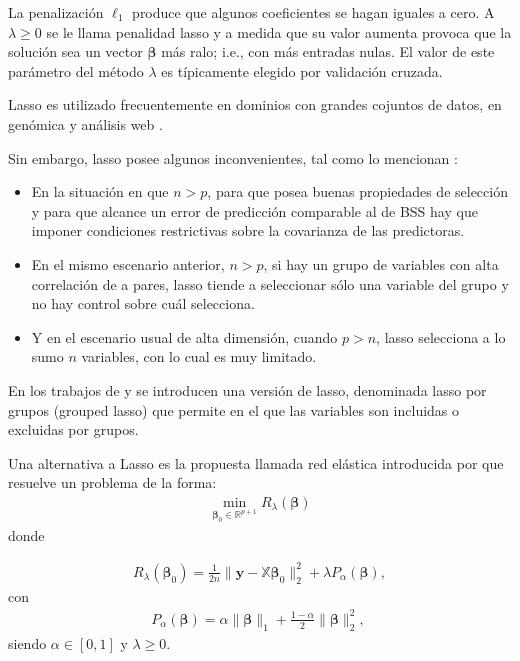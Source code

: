 \documentclass{report}
\begin{document}
 La penalización  $\ell_1$ produce que algunos coeficientes se hagan iguales a cero. A $\lambda \geq 0$  se le llama penalidad lasso y a medida que su valor aumenta provoca que la solución sea un vector $\boldsymbol{\beta}$ más ralo; i.e., con más entradas nulas. El valor de este parámetro del método $\lambda$ es típicamente elegido por validación cruzada. 


 Lasso es utilizado frecuentemente en dominios con grandes cojuntos de datos, en genómica y análisis web \cite{friedman2010}. 

 Sin embargo, lasso posee algunos inconvenientes, tal como lo mencionan \cite{zou2005, friedman2010}:
\begin{itemize}
	\item En la situación en que $n>p$,  para que posea buenas propiedades de selección y para que alcance un error de predicción comparable al de BSS hay que imponer condiciones restrictivas sobre la covarianza de las predictoras.
	\item En el mismo escenario anterior, $n>p$,  si hay un grupo de variables con alta correlación de a pares, lasso tiende a seleccionar sólo una variable del grupo y no hay control sobre cuál selecciona. 
	\item  Y en el escenario usual de alta dimensión, cuando $p>n$,  lasso selecciona a lo sumo $n$ variables, con lo cual es muy limitado.		
\end{itemize}


  En los trabajos de \cite{yuan2006}   y   \cite{meier2008}  se introducen una versión de lasso, denominada lasso por grupos (grouped lasso) que permite en el que las variables son incluidas o excluidas por grupos. 


 Una alternativa a Lasso es la propuesta llamada red elástica  introducida por \cite{zou2005} que resuelve un  problema de la forma: 
\begin{eqnarray}\label{elasnet}
\min _{\boldsymbol{\beta}_0\in \mathbb{R}^{p+1}} R_{\lambda}(\boldsymbol{\beta})
\end{eqnarray}
donde


\begin{eqnarray}\label{elasnetrlam}
 R_{\lambda}(\boldsymbol{\beta}_0)=\frac{1}{2n}\|\mathbf{y}-\mathbb{X} \boldsymbol{\beta}_0\|_2^2+ \lambda P_{\alpha}(\boldsymbol{\beta}), 
\end{eqnarray}
con 
\begin{eqnarray}\label{elasnet2}
P_{\alpha}(\boldsymbol{\beta})=\alpha\|\boldsymbol{\beta}\|_1+\frac{1-\alpha}{2}\|\boldsymbol{\beta}\|_2^2, \
\end{eqnarray}
siendo $\alpha \in [0,1]$ y $\lambda \geq 0.$
\end{document}
